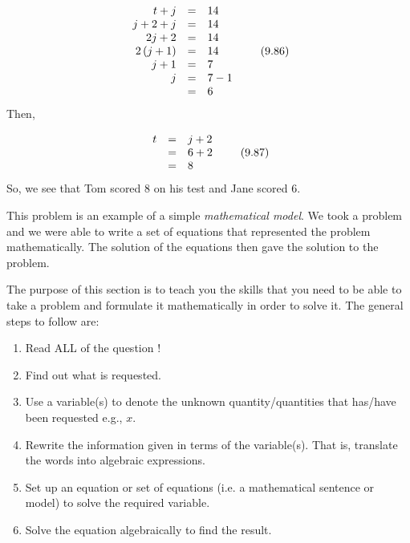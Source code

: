     \begin{equation}
    \begin{array}{ccc}\hfill t+j& =& 14\hfill \\ \hfill j+2+j& =& 14\hfill \\ \hfill 2j+2& =& 14\hfill \\ \hfill 2\left(j+1\right)& =& 14\hfill \\ \hfill j+1& =& 7\hfill \\ \hfill j& =& 7-1\hfill \\ & =& 6\hfill \end{array}\tag{9.86}
      \end{equation}
        \label{m39262*id161806}Then,\par 
        \label{m39262*id161812}\nopagebreak\noindent{}
          
    \begin{equation}
    \begin{array}{ccc}\hfill t& =& j+2\hfill \\ & =& 6+2\hfill \\ & =& 8\hfill \end{array}\tag{9.87}
      \end{equation}
        \label{m39262*id161871}So, we see that Tom scored 8 on his test and Jane scored 6.\par 
        \label{m39262*id161878}This problem is an example of a simple \textsl{mathematical model}. We took a problem and we were able to write a set of equations that represented the problem mathematically. The solution of the equations then gave the solution to the problem.\par 
      \label{m39262*uid103}
            \nopagebreak
        \label{m39262*id161898}The purpose of this section is to teach you the skills that you need to be able to take a problem and formulate it mathematically in order to solve it. The general steps to follow are:\par 
        \label{m39262*id161903}\begin{enumerate}[noitemsep, label=\textbf{\arabic*}. ] 
            \label{m39262*uid104}\item Read ALL of the question !
\label{m39262*uid105}\item Find out what is requested.
\label{m39262*uid106}\item Use a variable(s) to denote the unknown quantity/quantities that has/have been requested e.g., $x$.
\label{m39262*uid107}\item Rewrite the information given in terms of the variable(s). That is, translate the words into algebraic expressions. 
\label{m39262*uid108}\item Set up an equation or set of equations (i.e. a mathematical sentence or model) to solve the required variable.
\label{m39262*uid109}\item Solve the equation algebraically to find the result.
\end{enumerate}
      \label{m39262*uid110}
